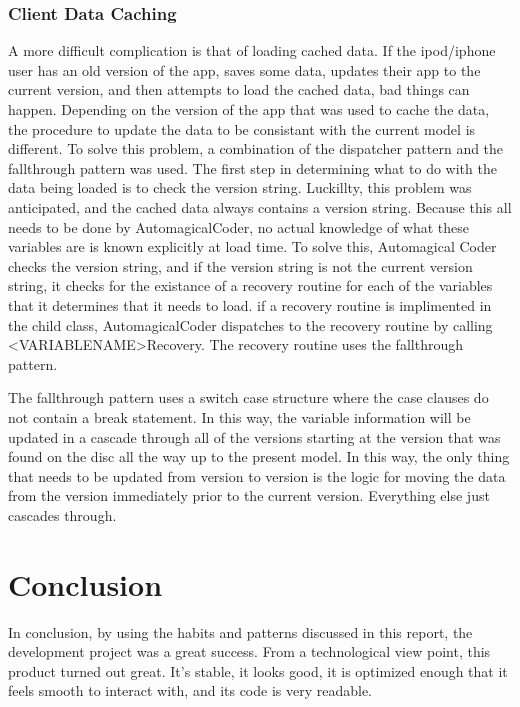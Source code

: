 \documentclass[se]{uw-wkrpt}
\begin{document}
\subsubsection{Client Data Caching}

A more difficult complication is that of loading cached data. If the ipod/iphone user has an old version of the
app, saves some data, updates their app to the current version, and then attempts to load the cached data,
bad things can happen. Depending on the version of the app that was used to cache the data, the procedure
to update the data to be consistant with the current model is different. To solve this problem, a combination
of the dispatcher pattern and the fallthrough pattern was used. The first step in determining what to do
with the data being loaded is to check the version string. Luckillty, this problem was anticipated, and 
the cached data always contains a version string. Because this all needs to be done by AutomagicalCoder,
no actual knowledge of what these variables are is known explicitly at load time. To solve this, Automagical
Coder checks the version string, and if the version string is not the current version string, it checks for
the existance of a recovery routine for each of the variables that it determines that it needs to load.
if a recovery routine is implimented in the child class, AutomagicalCoder dispatches to the recovery 
routine by calling <VARIABLENAME>Recovery. The recovery routine uses the fallthrough pattern.

The fallthrough pattern uses a switch case structure where the case clauses do not contain a break statement.
In this way, the variable information will be updated in a cascade through all of the versions starting
at the version that was found on the disc all the way up to the present model. In this way, the only
thing that needs to be updated from version to version is the logic for moving the data from the version
immediately prior to the current version. Everything else just cascades through.

\section{Conclusion}

In conclusion, by using the habits and patterns discussed in this report, the development project was a 
great success. From a technological view point, this product turned out great. It's stable, it looks good,
it is optimized enough that it feels smooth to interact with, and its code is very readable. 
\end{document}
